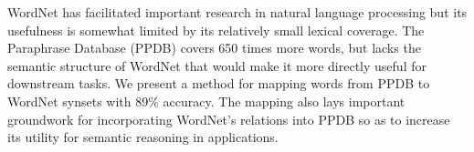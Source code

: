 WordNet has facilitated important research in natural language processing but its usefulness is somewhat limited by its relatively small lexical coverage. The Paraphrase Database (PPDB) covers 650 times more words, but lacks the semantic structure of WordNet that would make it more directly useful for downstream tasks. We present a method for mapping words from PPDB to WordNet synsets with 89\% accuracy. The mapping also lays important groundwork for incorporating WordNet's relations into PPDB so as to increase its utility for semantic reasoning in applications.
